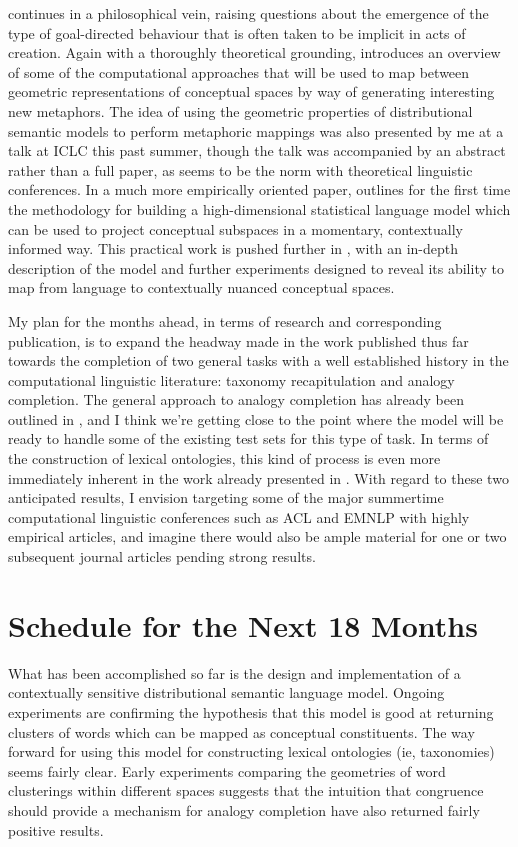 \cite{McGregorEA2015} continues in a philosophical vein, raising questions about the emergence of the type of goal-directed behaviour that is often taken to be implicit in acts of creation.  Again with a thoroughly theoretical grounding, \cite{McGregorEA2015b} introduces an overview of some of the computational approaches that will be used to map between geometric representations of conceptual spaces by way of generating interesting new metaphors.  The idea of using the geometric properties of distributional semantic models to perform metaphoric mappings was also presented by me at a talk at ICLC this past summer, though the talk was accompanied by an abstract rather than a full paper, as seems to be the norm with theoretical linguistic conferences.  In a much more empirically oriented paper, \cite{AgresEA2015} outlines for the first time the methodology for building a high-dimensional statistical language model which can be used to project conceptual subspaces in a momentary, contextually informed way.  This practical work is pushed further in \cite{McGregorEA2015c}, with an in-depth description of the model and further experiments designed to reveal its ability to map from language to contextually nuanced conceptual spaces.

My plan for the months ahead, in terms of research and corresponding publication, is to expand the headway made in the work published thus far towards the completion of two general tasks with a well established history in the computational linguistic literature: taxonomy recapitulation and analogy completion.  The general approach to analogy completion has already been outlined in \cite{McGregorEA2015b}, and I think we're getting close to the point where the model will be ready to handle some of the existing test sets for this type of task.  In terms of the construction of lexical ontologies, this kind of process is even more immediately inherent in the work already presented in \cite{AgresEA2015,McGregorEA2015c}.  With regard to these two anticipated results, I envision targeting some of the major summertime computational linguistic conferences such as ACL and EMNLP with highly empirical articles, and imagine there would also be ample material for one or two subsequent journal articles pending strong results.

\section{Schedule for the Next 18 Months}
What has been accomplished so far is the design and implementation of a contextually sensitive distributional semantic language model.  Ongoing experiments are confirming the hypothesis that this model is good at returning clusters of words which can be mapped as conceptual constituents.  The way forward for using this model for constructing lexical ontologies (ie, taxonomies) seems fairly clear.  Early experiments comparing the geometries of word clusterings within different spaces suggests that the intuition that congruence should provide a mechanism for analogy completion have also returned fairly positive results.

